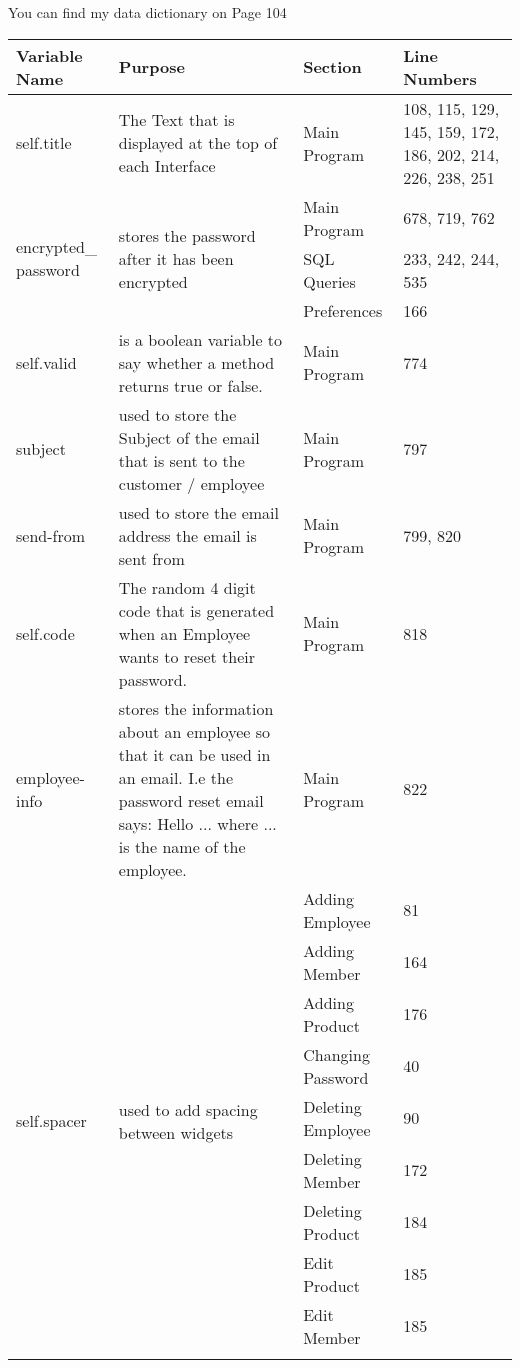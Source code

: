 You can find my data dictionary on Page 104 
\begin{center}
    \begin{longtable}{|p{1.5cm}|p{4.5cm}|p{1.5cm}|p{3cm}|}
        \hline
        \textbf{Variable Name} & \textbf{Purpose} & \textbf{Section} & \textbf{Line Numbers}\\ \hline
	self.title & The Text that is displayed at the top of each Interface & Main Program & 108, 115, 129, 145, 159, 172, 186, 202, 214, 226, 238, 251 \\ \hline
	\multirow{3}{1.5cm}{encrypted\_ password} & \multirow{3}{4.5cm}{stores the password after it has been encrypted} & Main Program & 678, 719, 762 \\ \cline{3-4}
	& & SQL Queries & 233, 242, 244, 535 \\ \cline{3-4}
	& & Preferences & 166 \\ \hline
	self.valid & is a boolean variable to say whether a method returns true or false. & Main Program &  774 \\ \hline
	subject & used to store the Subject of the email that is sent to the customer / employee & Main Program & 797 \\ \hline
	send-from & used to store the email address the email is sent from & Main Program & 799, 820 \\ \hline
	self.code & The random 4 digit code that is generated when an Employee wants to reset their password. & Main Program & 818 \\ \hline
	employee-info & stores the information about an employee so that it can be used in an email. I.e the password reset email says: Hello ... where ... is the name of the employee. & Main Program & 822 \\ \hline
	\multirow{11}{1.5cm}{self.spacer} & \multirow{11}{4.5cm}{used to add spacing between widgets} & Adding Employee &  81 \\ \cline{3-4}
	& & Adding Member & 164 \\ \cline{3-4}
	& & Adding Product & 176 \\ \cline{3-4}
	& & Changing Password & 40 \\ \cline{3-4}
	& & Deleting Employee & 90 \\ \cline{3-4}
	& & Deleting Member & 172 \\ \cline{3-4}
	& & Deleting Product & 184 \\ \cline{3-4}
	& & Edit Product & 185 \\ \cline{3-4}
	& & Edit Member & 185 \\ \cline{3-4}

\end{longtable}
\end{center}
